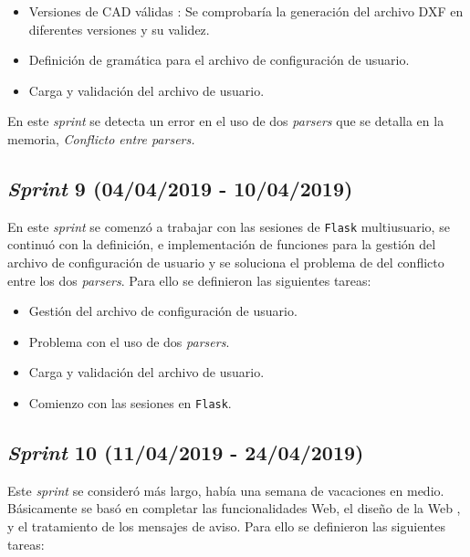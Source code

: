 \begin{itemize}
\item Versiones de CAD válidas : Se comprobaría la generación del archivo DXF en diferentes versiones y su validez. 

\item  Definición de gramática para el archivo de configuración de usuario.

\item Carga y validación del archivo de usuario.

\end{itemize}

En este \emph{sprint} se detecta un error en el uso de dos \emph{parsers} que se detalla en la memoria, \textit{Conflicto entre \emph{parsers}.}
 
\subsection{\emph{Sprint} 9 (04/04/2019 - 10/04/2019)}

En este \emph{sprint} se comenzó a trabajar con las sesiones de \texttt{Flask} multiusuario, se continuó con la definición, e implementación de funciones para la gestión del archivo de configuración de usuario y se soluciona el problema de del conflicto entre los dos \emph{parsers}. Para ello se definieron las siguientes tareas:

\begin{itemize}
\item Gestión del archivo de configuración de usuario. 

\item  Problema con el uso de dos \emph{parsers}.

\item Carga y validación del archivo de usuario.

\item Comienzo con las sesiones en \texttt{Flask}.
\end{itemize}

\subsection{\emph{Sprint} 10 (11/04/2019 - 24/04/2019)}

Este \emph{sprint} se consideró más largo, había una semana de vacaciones en medio. Básicamente se basó en completar las funcionalidades Web, el diseño de la Web , y el tratamiento de los mensajes de aviso. Para ello se definieron las siguientes tareas: 
 

